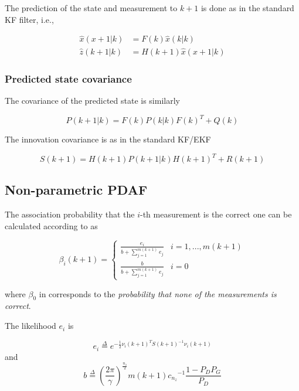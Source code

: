 The prediction of the state and measurement to $k+1$ is done as in the standard KF filter, i.e.,


\begin{equation}
\begin{aligned}
\hat{x}(x+1|k) &=  F(k)\hat{x}(k|k) \\
\hat{z}(k+1|k) &= H(k+1)\hat{x}(x+1|k)
\end{aligned}
\end{equation}

\subsubsection{Predicted state covariance}

The covariance of the predicted state is similarly

\begin{equation}
P(k+1|k) = F(k)P(k|k)F(k)^T + Q(k)
\end{equation}




The innovation covariance is as in the standard KF/EKF

\begin{equation}
S(k+1) = H(k+1)P(k+1|k)H(k+1)^T + R(k+1)
\end{equation}


\subsection{Non-parametric PDAF}


The association probability that the $i$-th measurement is the correct one can be calculated according to \cite{Kirubarajan2004} as

\begin{equation}\label{eq:betas}
\beta_i(k+1)=
\left\{\begin{array}{ll}
\frac{e_i}{b+\sum_{j=1}^{m(k+1)}e_j}  & i = 1,...,m(k+1) \\
\frac{b}{b+\sum_{j=1}^{m(k+1)}e_j} & i=0
\end{array}
\right.
\end{equation}


where $\beta_0$ in  corresponds to the \emph{probability that none of the measurements is correct}.

The likelihood $e_i$ is

$$
e_i \overset{\Delta}{=}  e^{-\frac{1}{2} \nu_i(k+1)^T S(k+1)^{-1} \nu_i(k+1)}
$$
and 
$$
b \overset{\Delta}{=} \left(\frac{2\pi}{\gamma}\right)^{\frac{n_z}{2}}m(k+1){c_{n_z}}^{-1}\frac{1-P_D P_G}{P_D}
$$

